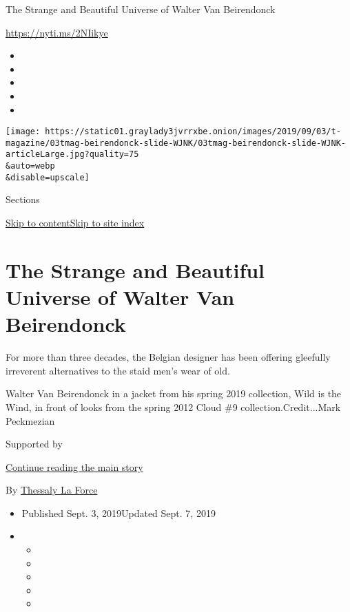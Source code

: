 The Strange and Beautiful Universe of Walter Van Beirendonck

\url{https://nyti.ms/2NIikye}

\begin{itemize}
\item
\item
\item
\item
\item
\end{itemize}

\texttt{[image: https://static01.graylady3jvrrxbe.onion/images/2019/09/03/t-magazine/03tmag-beirendonck-slide-WJNK/03tmag-beirendonck-slide-WJNK-articleLarge.jpg?quality=75\\\&auto=webp\\\&disable=upscale]}

Sections

\protect\hyperlink{site-content}{Skip to
content}\protect\hyperlink{site-index}{Skip to site index}

\hypertarget{the-strange-and-beautiful-universe-of-walter-van-beirendonck}{%
\section{The Strange and Beautiful Universe of Walter Van
Beirendonck}\label{the-strange-and-beautiful-universe-of-walter-van-beirendonck}}

For more than three decades, the Belgian designer has been offering
gleefully irreverent alternatives to the staid men's wear of old.

Walter Van Beirendonck in a jacket from his spring 2019 collection, Wild
is the Wind, in front of looks from the spring 2012 Cloud \#9
collection.Credit...Mark Peckmezian

Supported by

\protect\hyperlink{after-sponsor}{Continue reading the main story}

By
\href{https://www.nytimes3xbfgragh.onion/by/thessaly-la-force}{Thessaly
La Force}

\begin{itemize}
\item
  Published Sept. 3, 2019Updated Sept. 7, 2019
\item
  \begin{itemize}
  \item
  \item
  \item
  \item
  \item
  \end{itemize}
\end{itemize}

